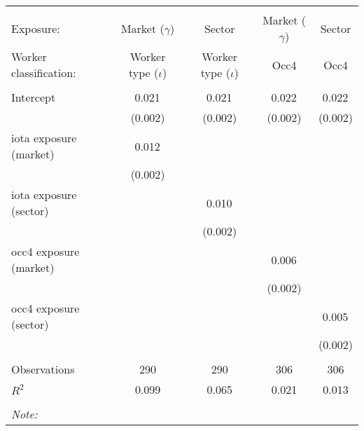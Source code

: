 \begin{tabular}{@{\extracolsep{5pt}}lcccc}
\\[-1.8ex]\hline
\hline \\[-1.8ex]
\hline \\[-1.8ex]
 Exposure: & Market ($\gamma$) & Sector & Market ($\gamma$) & Sector \\
 Worker classification: & Worker type ($\iota$) & Worker type ($\iota$) & Occ4 & Occ4 \\
 \hline &  &  &  &  \\
 Intercept & 0.021$^{}$ & 0.021$^{}$ & 0.022$^{}$ & 0.022$^{}$ \\
  & (0.002) & (0.002) & (0.002) & (0.002) \\
 iota exposure (market) & 0.012$^{}$ & & & \\
  & (0.002) & & & \\
 iota exposure (sector) & & 0.010$^{}$ & & \\
  & & (0.002) & & \\
 occ4 exposure (market) & & & 0.006$^{}$ & \\
  & & & (0.002) & \\
 occ4 exposure (sector) & & & & 0.005$^{}$ \\
  & & & & (0.002) \\
\hline \\[-1.8ex]
 Observations & 290 & 290 & 306 & 306 \\
 $R^2$ & 0.099 & 0.065 & 0.021 & 0.013 \\
\hline
\hline \\[-1.8ex]
\textit{Note:}\end{tabular}